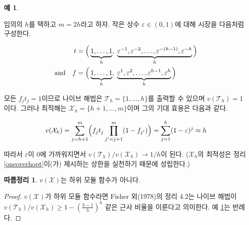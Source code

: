 \documentclass[11pt]{article} %
\newif\ifen
\newtheorem{corollary}{Corollary}
\theoremstyle{definition}
\newtheorem{example}{Example}
\newtheorem{corollary}{따름정리}
\theoremstyle{definition}
\newtheorem{example}{예}
\begin{document}
\begin{example} \label{tightexampleforoneoverhopt}
\ifen
Pick any $h$ and let $m = 2h$. For a small constant $\varepsilon \in (0, 1)$, construct the market as follows.
\else
임의의 $h$를 택하고 $m = 2h$라고 하자. 작은 상수  $\varepsilon \in (0, 1)$에 대해 시장을 다음처럼 구성한다.
\fi
\begin{align*}
t &= \Bigl(\,\underbrace{1,  \dots, 1}_{h},\;
\underbrace{\varepsilon^{-1}, \varepsilon^{-2}, \dots, \varepsilon^{-(h-1)}, \varepsilon^{-h}}_{h}\,\Bigr) \\
\text{and}\quad f &= \Bigl(\,\underbrace{1,  \dots, 1}_{h},\;
\underbrace{\varepsilon^{1}, \varepsilon^{2}, \dots, \varepsilon^{h-1}, \varepsilon^{h}}_{h}\,\Bigr)
\end{align*}
\ifen
Since all $f_j t_j = 1$, the na\"ive algorithm can choose $\mathcal{T}_h = \{1, \dots, h\}$, with $v(\mathcal{T}_h) = 1$. But the optimal solution is $\mathcal{X}_h = \{h+1, \dots, m\}$, with
\else
모든 $f_j t_j = 1$이므로 나이브 해법은 $\mathcal{T}_h = \{1, \dots, h\}$를 출력할 수 있으며 $v(\mathcal{T}_h) = 1$이다. 그러나 최적해는 $\mathcal{X}_h = \{h+1, \dots, m\}$이며 그의 기대 효용은 다음과 같다.
\fi
\begin{equation*}
v(\mathcal{X}_h) = \sum_{j= h +1}^m \Bigl( f_j t_j \prod_{j' = j+1}^m (1 - f_{j'}) \Bigr) =  \sum_{j= 1}^h  (1 - \varepsilon)^{j} \approx h\ifen.\fi
\end{equation*}
\ifen
Thus, as $\varepsilon$ approaches zero, we have $v(\mathcal{T}_h) / v(\mathcal{X}_h) \to 1/h$. (The optimality of $\mathcal{X}_h$ follows from the fact that it achieves the upper bound of Theorem \ref{oneoverhopt}.)
\else
따라서 $\varepsilon$이 0에 가까워지면서 $v(\mathcal{T}_h) / v(\mathcal{X}_h) \to 1/h$이 된다.  ($\mathcal{X}_h$의 최적성은 정리 \ref{oneoverhopt}이(가) 제시하는 상한을 실천하기 때문에 성립한다.)
\fi
\end{example}

\begin{corollary}
\ifen
The function $v(\mathcal{X})$ is not submodular. 
\else
$v(\mathcal{X})$는 하위 모듈 함수가 아니다.
\fi
\end{corollary}
\begin{proof}
\ifen
If $v(\mathcal{X})$ is submodular, then theorem 4.2 of Fisher et al. (1978) implies that the na\"ive algorithm achieves an optimality ratio of $v(\mathcal{T}_h) / v(\mathcal{X}_h)  \geq 1 - \left(\frac{h-1}{h}\right)^h$. Example \ref{tightexampleforoneoverhopt} provides a counterexample.
\else
$v(\mathcal{X})$가 하위 모듈 함수라면 Fisher 외(1978)의 정리 4.2는 나이브 해법이 $v(\mathcal{T}_h) / v(\mathcal{X}_h)  \geq 1 - \left(\frac{h-1}{h}\right)^h$ 같은 근사 비율을 이룬다고 의미한다. 예 \ref{tightexampleforoneoverhopt}는 반례다.
\fi
\end{proof}
\end{document}

